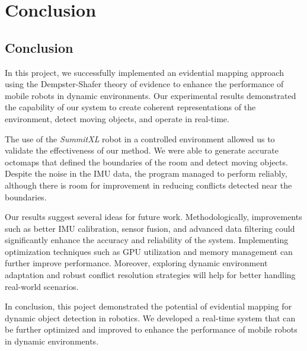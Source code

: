\chapter{Conclusion}

\section*{Conclusion}

In this project, we successfully implemented an evidential mapping approach using the Dempster-Shafer theory of evidence to enhance the performance of mobile robots in dynamic environments.
Our experimental results demonstrated the capability of our system to create coherent representations of the environment, detect moving objects, and operate in real-time.

The use of the \textit{SummitXL} robot in a controlled environment allowed us to validate the effectiveness of our method.
We were able to generate accurate octomaps that defined the boundaries of the room and detect moving objects.
Despite the noise in the IMU data, the program managed to perform reliably, although there is room for improvement in reducing conflicts detected near the boundaries.

Our results suggest several ideas for future work.
Methodologically, improvements such as better IMU calibration, sensor fusion, and advanced data filtering could significantly enhance the accuracy and reliability of the system.
Implementing optimization techniques such as GPU utilization and memory management can further improve performance.
Moreover, exploring dynamic environment adaptation and robust conflict resolution strategies will help for better handling real-world scenarios.

In conclusion, this poject demonstrated the potential of evidential mapping for dynamic object detection in robotics.
We developed a real-time system that can be further optimized and improved to enhance the performance of mobile robots in dynamic environments.

